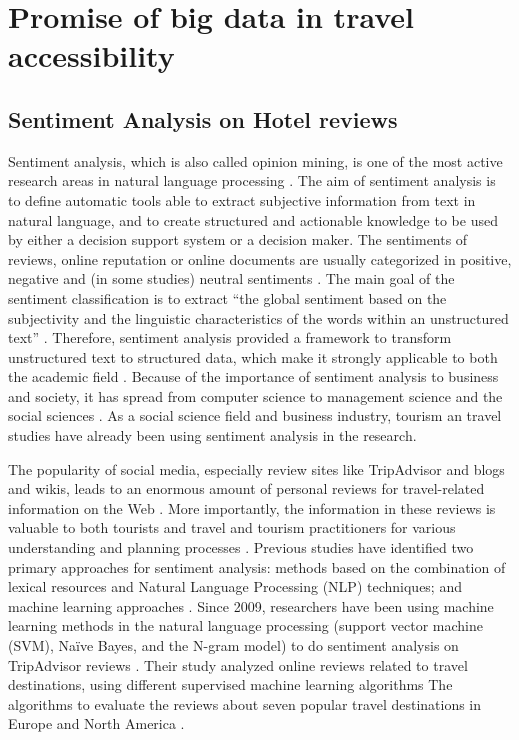 \section{Promise of big data in travel accessibility}

\subsection{Sentiment Analysis on Hotel reviews}
Sentiment analysis, which is also called opinion mining, is one of the most active
research areas in natural language processing \cite{opinion2014}. The aim of sentiment analysis is to define automatic tools able to extract subjective information from text in natural \cite{article} language, and to create structured and actionable knowledge to be used by either a decision support system or a decision maker. The sentiments of reviews, online reputation or online documents are usually categorized in positive, negative and (in some studies) neutral sentiments \cite{Garcia2012}. The main goal of the sentiment classification is to extract ``the global sentiment based on the subjectivity and the linguistic characteristics of the words within an unstructured text'' \cite{Garcia2012}. Therefore, sentiment analysis provided a framework to transform unstructured text to structured data, which make it strongly applicable to both the academic field \cite{Cam2013}. Because of the importance of sentiment analysis to business and society, it has spread from computer science to management science and the social sciences \cite{Pozzi}. As a social science field and business industry, tourism an travel studies have already been using sentiment analysis in the research.

The popularity of social media, especially review sites like TripAdvisor and blogs and wikis, leads to an enormous amount of personal reviews for travel-related information on the Web \cite{opinion2014}. More importantly, the information in these reviews is valuable to both tourists and travel and tourism practitioners for various understanding and planning processes \cite{YE20096527}. Previous studies have identified two primary approaches for sentiment analysis: methods based on the combination of lexical resources and Natural Language Processing (NLP) techniques; and machine learning approaches \cite{Garcia2012}. Since 2009, researchers have been using machine learning methods in the natural language processing (support vector machine (SVM), Naïve Bayes, and the N-gram model) to do sentiment analysis on TripAdvisor reviews \cite{YE20096527}. 
Their study analyzed online reviews related to travel destinations, using different supervised machine learning algorithms The
algorithms to evaluate the reviews about seven popular travel destinations in Europe and North America \cite{YE20096527}.


